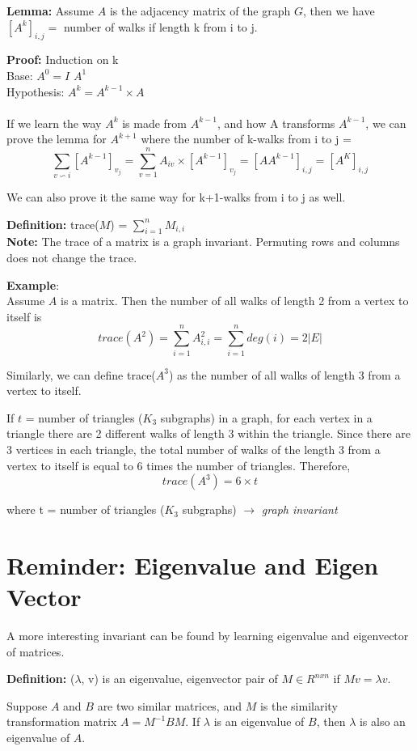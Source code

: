 \documentclass{article}
\begin{document}
\textbf{Lemma:} Assume $A$ is the adjacency matrix of the graph $G$, then we have $[A^k]_{i,j}=$ number of walks if length k from i to j. 

\textbf{Proof:} Induction on k
\\ Base: $A^0=I$ \checkmark $A^1$ \checkmark
\\ Hypothesis: $A^k= A^{k-1}\times A$
\\ \\ If we learn the way $A^k$ is made from $A^{k-1}$, and how A transforms $A^{k-1}$, we can prove the lemma for $A^{k+1}$ where the number of k-walks from i to j = $$\sum_{v \backsim i}^{} [A^{k-1}]_{v_j} = \sum_{v=1}^{n} A_{iv} \times [A^{k-1}]_{v_j}= [A A^{k-1}]_{i,j} = [A^K]_{i,j}$$
 
We can also prove it the same way for k+1-walks from i to j as well.

\textbf{Definition:} trace($M$) = $\sum_{i=1}^{n} M_{i,i} $   
\\ \textbf{Note:} The trace of a matrix is a graph invariant. Permuting rows and columns does not change the trace.

\textbf{Example}: 
\\ Assume $A$ is a matrix. Then the number of all walks of length 2 from a vertex to itself is
$$trace(A^2) = \sum_{i=1}^{n} A^2_{i,i} = \sum_{i=1}^{n} deg(i) = 2|E|$$ 

Similarly, we can define trace($A^3$) as the number of all walks of length 3 from a vertex to itself.

If $t$ = number of triangles ($K_3$ subgraphs) in a graph, for each vertex in a triangle there are 2 different walks of length 3 within the triangle. Since there are 3 vertices in each triangle, the total number of walks of the length 3 from a vertex to itself is equal to 6 times the number of triangles. Therefore,
$$trace(A^3) = 6\times t$$

where t = number of triangles ($K_3$ subgraphs) $\rightarrow$ \textit{graph invariant}

\section{Reminder: Eigenvalue and Eigen Vector}
A more interesting invariant can be found by learning eigenvalue and eigenvector of matrices.

\textbf{Definition:} ($\lambda$, v) is an eigenvalue, eigenvector pair of $M \in R^{n x n}$ if $Mv = \lambda v$.  

Suppose $A$ and $B$ are two similar matrices, and $M$ is the similarity transformation matrix $A = M^{-1}BM$. If $\lambda$ is an eigenvalue of $B$, then $\lambda$ is also an eigenvalue of $A$.
    
\end{document}
